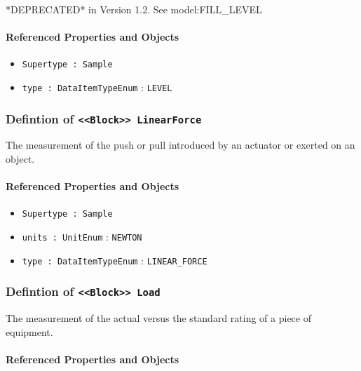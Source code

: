 \FloatBarrier

*DEPRECATED* in Version 1.2.  See {model:FILL_LEVEL}

\FloatBarrier
\paragraph{Referenced Properties and Objects}

\begin{itemize}
\item \texttt{Supertype : Sample}

\item \texttt{type : DataItemTypeEnum} : \texttt{LEVEL}

\end{itemize}
\FloatBarrier
\subsubsection{Defintion of \texttt{<<Block>> LinearForce}}
  \label{type:LinearForce}

\FloatBarrier

The measurement of the push or pull introduced by an actuator or exerted on an object.

\FloatBarrier
\paragraph{Referenced Properties and Objects}

\begin{itemize}
\item \texttt{Supertype : Sample}

\item \texttt{units : UnitEnum} : \texttt{NEWTON}

\item \texttt{type : DataItemTypeEnum} : \texttt{LINEAR_FORCE}

\end{itemize}
\FloatBarrier
\subsubsection{Defintion of \texttt{<<Block>> Load}}
  \label{type:Load}

\FloatBarrier

The measurement of the actual versus the standard rating of a piece of equipment.

\FloatBarrier
\paragraph{Referenced Properties and Objects}

